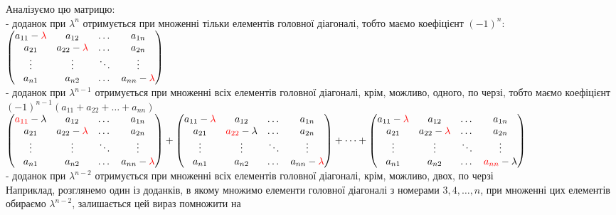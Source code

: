 \documentclass[a4paper, 14pt]{extarticle}
\begin{document}
Аналізуємо цю матрицю:\\
- доданок при $\lambda^n$ отримується при множенні тільки елементів головної діагоналі, тобто маємо коефіцієнт $(-1)^n$:\\
$\begin{pmatrix}
a_{11}-\textcolor{red}{\lambda} & a_{12} & \dots & a_{1n} \\
a_{21} & a_{22}-\textcolor{red}{\lambda} & \dots & a_{2n} \\
\vdots & \vdots & \ddots & \vdots \\
a_{n1} & a_{n2} & \dots & a_{nn}-\textcolor{red}{\lambda}
\end{pmatrix}$\\
- доданок при $\lambda^{n-1}$ отримується при множенні всіх елементів головної діагоналі, крім, можливо, одного, по черзі, тобто маємо коефіцієнт \\ $(-1)^{n-1}(a_{11}+a_{22}+\dots+a_{nn})$\\
$\begin{pmatrix}
\textcolor{red}{a_{11}}-\lambda & a_{12} & \dots & a_{1n} \\
a_{21} & a_{22}-\textcolor{red}{\lambda} & \dots & a_{2n} \\
\vdots & \vdots & \ddots & \vdots \\
a_{n1} & a_{n2} & \dots & a_{nn}-\textcolor{red}{\lambda}
\end{pmatrix} + \begin{pmatrix}
a_{11}-\textcolor{red}{\lambda} & a_{12} & \dots & a_{1n} \\
a_{21} & \textcolor{red}{a_{22}}-\lambda & \dots & a_{2n} \\
\vdots & \vdots & \ddots & \vdots \\
a_{n1} & a_{n2} & \dots & a_{nn}-\textcolor{red}{\lambda}
\end{pmatrix} + \dots + \begin{pmatrix}
a_{11}-\textcolor{red}{\lambda} & a_{12} & \dots & a_{1n} \\
a_{21} & a_{22}-\textcolor{red}{\lambda} & \dots & a_{2n} \\
\vdots & \vdots & \ddots & \vdots \\
a_{n1} & a_{n2} & \dots & \textcolor{red}{a_{nn}}-\lambda
\end{pmatrix}$\\
- доданок при $\lambda^{n-2}$ отримується при множенні всіх елементів головної діагоналі, крім, можливо, двох, по черзі\\
Наприклад, розглянемо один із доданків, в якому множимо елементи головної діагоналі з номерами $3,4,\dots,n$, при множенні цих елементів обираємо $\lambda^{n-2}$, залишається цей вираз помножити на \\ 
\end{document}
